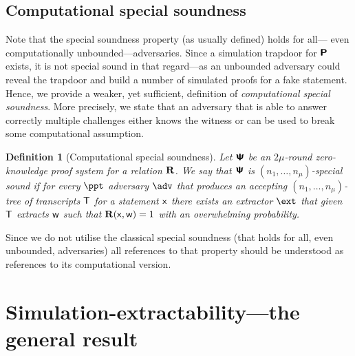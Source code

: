 \let\accentvec\vec \documentclass[runningheads,10pt]{llncs}
\newtheorem{definition}[theorem]{Definition}
\begin{document}
\subsection{Computational special soundness}
Note that the special soundness property (as usually defined) holds for all--- even computationally unbounded---adversaries. Since a simulation trapdoor for $\bm{\mathsf{P}}$ exists, it is not special sound in that regard---as an unbounded adversary could reveal the trapdoor and build a number of simulated proofs for a fake statement. 
Hence, we provide a weaker, yet sufficient, definition of \emph{computational special soundness}. More precisely, we state that an adversary that is able to answer correctly multiple challenges either knows the witness or can be used to break some computational assumption. 

\begin{definition}[Computational special soundness]
	Let $\bm{\mathsf{\Psi}}$ be an $2 \mu$-round zero-knowledge proof system for a relation $\mathbf{R}$. 
	We say that $\bm{\mathsf{\Psi}}$ is $(n_1, \ldots, n_\mu)$-\emph{special sound} if for every $\ppt$ adversary $\adv$ that produces an accepting $(n_1, \ldots, n_\mu)$-tree of transcripts $\mathsf{T}$ for a statement $\mathsf{x}$ there exists an extractor $\ext$ that given $\mathsf{T}$ extracts $\mathsf{w}$ such that $\mathbf{R}(\mathsf{x}, \mathsf{w}) = 1$ with an overwhelming probability.
\end{definition}

Since we do not utilise the classical special soundness (that holds for all, even unbounded, adversaries) all references to that property should be understood as references to its computational version.


\section{Simulation-extractability---the general result}
\end{document}
